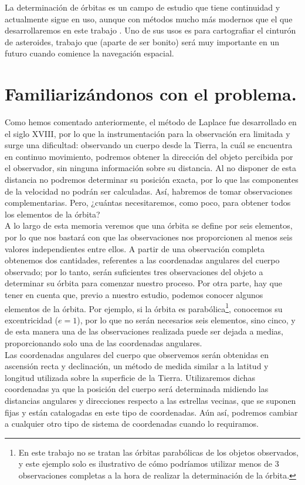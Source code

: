 La determinación de órbitas es un campo de estudio que tiene continuidad y actualmente sigue en uso, aunque con métodos mucho más modernos que el que desarrollaremos en este trabajo \cite{gronchi_unesco}. Uno de sus usos es para cartografiar el cinturón de asteroides, trabajo que (aparte de ser bonito) será muy importante en un futuro cuando comience la navegación espacial.\\


\section{Familiarizándonos con el problema.}
Como hemos comentado anteriormente, el método de Laplace fue desarrollado en el siglo XVIII, por lo que la instrumentación para la observación era limitada y surge una dificultad: observando un cuerpo desde la Tierra, la cuál se encuentra en continuo movimiento, podremos obtener la dirección del objeto percibida por el observador, sin ninguna información sobre su distancia. Al no disponer de esta distancia no podremos determinar su posición exacta, por lo que las componentes de la velocidad no podrán ser calculadas. Así, habremos de tomar observaciones complementarias. Pero, ¿cuántas necesitaremos, como poco, para obtener todos los elementos de la órbita?\\

A lo largo de esta memoria veremos que una órbita se define por seis elementos, por lo que nos bastará con que las observaciones nos proporcionen al menos seis valores independientes entre ellos. A partir de una observación completa obtenemos dos cantidades, referentes a las coordenadas angulares del cuerpo observado; por lo tanto, serán suficientes tres observaciones del objeto a determinar su órbita para comenzar nuestro proceso. Por otra parte, hay que tener en cuenta que, previo a nuestro estudio, podemos conocer algunos elementos de la órbita. Por ejemplo, si la órbita es parabólica\footnote{En este trabajo no se tratan las órbitas parabólicas de los objetos observados, y este ejemplo solo es ilustrativo de cómo podríamos utilizar menos de 3 observaciones completas a la hora de realizar la determinación de la órbita.}, conocemos su excentricidad ($e=1$), por lo que no serán necesarios seis elementos, sino cinco, y de esta manera una de las observaciones realizada puede ser dejada a medias, proporcionando solo una de las coordenadas angulares.\\

Las coordenadas angulares del cuerpo que observemos serán obtenidas en ascensión recta y declinación, un método de medida similar a la latitud y longitud utilizada sobre la superficie de la Tierra. Utilizaremos dichas coordenadas ya que la posición del cuerpo será determinada midiendo las distancias angulares y direcciones respecto a las estrellas vecinas, que se suponen fijas y están catalogadas en este tipo de coordenadas. Aún así, podremos cambiar a cualquier otro tipo de sistema de coordenadas cuando lo requiramos.\\

